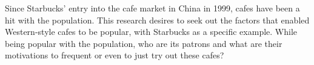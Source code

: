 Since Starbucks' entry into the cafe market in China in 1999, cafes have been a
hit with the population. This research desires to seek out the factors that
enabled Western-style cafes to be popular, with Starbucks as a specific example.
While being popular with the population, who are its patrons and what are their
motivations to frequent or even to just try out these cafes? 







\begin{comment}
\begin{itemize}
	\item Habitus as a framework
	\item Drinker demographics
	\item How did international franchises adapt
	\item How did the coffee culture start
\end{itemize}
\end{comment}

